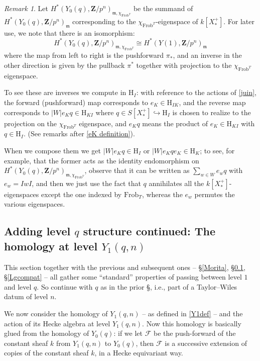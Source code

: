 \documentclass[10pt]{amsart}
\newcommand{\Z}{\mathbf{Z}}
\newcommand{\Frob}{\mathrm{Frob}}
\theoremstyle{remark}
\newtheorem*{remark}{Remark}
\begin{document}
\begin{remark}  Let $H^*(Y_0(q), \Z/p^n)_{\mathfrak{m}, \chi_{\Frob^T}}$ be the summand of $H^*(Y_0(q), \Z/p^n)_{\mathfrak{m}}$
corresponding to the $\chi_{\Frob^T}$-eigenspace of $k[X_*^+]$. 
For later use, we note that there is an isomorphism:
\begin{equation}\label{doubleprojremark} H^*(Y_0(q), \Z/p^n)_{\mathfrak{m}, \chi_{\Frob^T}} \cong H^*(Y(1), \Z/p^n)_{\mathfrak{m}}\end{equation}
where  the map from left to right is the  pushforward $\pi_*$, and an inverse in the other direction is given   by the pullback  $\pi^*$ together with projection to the
$\chi_{\Frob^T}$ eigenspace.  

 To see these are inverses we compute in $\mathrm{H}_{I}$: with reference to the actions of \eqref{juin}, the forward (pushforward) map corresponds  
to $e_K \in \mathrm{H}_{IK}$, and the reverse map corresponds to
 $|W| e_K q  \in \mathrm{H}_{KI}$ where $q \in S[X_*^+] \hookrightarrow \mathrm{H}_I$
is chosen to realize to the projection on the $\chi_{\Frob^T}$ eigenspace,
and $e_K q$ means the product of $e_K \in \mathrm{H}_{KI}$ with $q \in \mathrm{H}_I$.
 (See remarks after \eqref{eK definition}). 

%
%
%
 When we compose them we get
$|W| e_K q \in \mathrm{H}_{I}$ or $|W| e_K q e_K \in \mathrm{H}_K$; to see, for example, that    the former acts as the identity endomorphism
on $H^*(Y_0(q), \Z/p^n)_{\mathfrak{m}, \chi_{\Frob^T}}$, 
observe that it  can be written as $ \sum_{w \in W} e_w q$ with $e_w = I w I$,
 and then we just use the fact that $q$ annihilates all the  $k[X_*^+]$-eigenspaces  except the one indexed by $\Frob_T$,
 whereas the $e_w$ permutes the various eigenspaces. 
\end{remark} 
   
   \subsection{Adding level $q$ structure continued: The homology at level $Y_1(q, n)$} \label{HYln} 
   
   This section together with the previous and subsequent ones -- \S \ref{Morita}, \S \ref{HYln},   \S \ref{Lgcompat} --  all gather some ``standard'' properties of passing between level $1$ and level $q$. So  continue with $q$ as in the prior \S, i.e., part of a Taylor--Wiles datum of level $n$. 
   
   We now consider the  homology of $Y_1(q, n)$ -- as defined in \eqref{Y1def} -- and the action of its  Hecke algebra at level $Y_1(q, n)$. 
   Now this homology is basically glued from the homology of $Y_0(q)$:
   if we let  
   $\mathcal{F}$ be the push-forward of  the constant sheaf $k$
 from $Y_1(q,n)$ to $Y_0(q)$, then $\mathcal{F}$ is  a successive extension of copies of the constant sheaf  $k$,
 in a Hecke equivariant way. 
   
\end{document}
